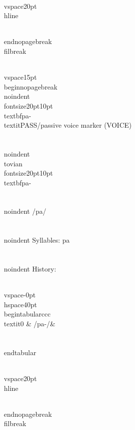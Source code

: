 \\vspace{20pt}\\hline

\\end{nopagebreak}
\\filbreak



\\vspace{15pt}
\\begin{nopagebreak}
\\noindent{\\fontsize{20pt}{10pt}\\textbf{pa-} } \\textit{PASS/passive voice marker} (VOICE)\\\\
\\noindent {\\tovian \\fontsize{20pt}{10pt} \\textbf{pa-} }\\\\
\\noindent /p{\textprimstress}a/\\\\
\\noindent Syllables: pa\\\\


\\noindent History:

\\vspace{-0pt}
\\hspace{40pt}
\\begin{tabular}{ccc}
\\textit{0} & /pa-/& \\\\
\\end{tabular}

\\vspace{20pt}\\hline

\\end{nopagebreak}
\\filbreak



